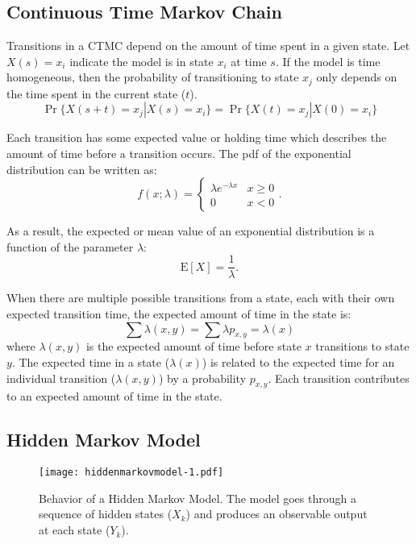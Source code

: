 \subsection{Continuous Time Markov Chain}

Transitions in a \ac{CTMC} depend on the amount of time spent in a given state.
Let $X(s) = x_i$ indicate the model is in state $x_i$ at time $s$.
If the model is time homogeneous, then the probability of transitioning to state $x_j$ only depends on the time spent in the current state ($t$).
\begin{equation}
    \Pr\{ X(s+t)=x_j | X(s) = x_i \} = \Pr\{ X(t)=x_j | X(0) = x_i \}
\end{equation}

Each transition has some expected value or holding time which describes the amount of time before a transition occurs.
The \ac{pdf} of the exponential distribution can be written as: \cite{MARKOV1}
\begin{equation}
f(x;\lambda) = \begin{cases}
\lambda e^{-\lambda x} & x \ge 0 \\
0 & x < 0
\end{cases}.
\end{equation}

As a result, the expected or mean value of an exponential distribution is a function of the parameter $\lambda$: \cite{MARKOV1}
\begin{equation}
\mathrm{E}[X] = \frac{1}{\lambda}. \!
\end{equation}

When there are multiple possible transitions from a state, each with their own expected transition time, the expected amount of time in the state is: \cite{MARKOV2}
\begin{equation}
\sum \lambda(x,y) = \sum \lambda p_{x,y} = \lambda(x)
\end{equation}
where $\lambda(x,y)$ is the expected amount of time before state $x$ transitions to state $y$.
The expected time in a state ($\lambda(x)$) is related to the expected time for an individual transition ($\lambda(x,y)$) by a probability $p_{x,y}$.
Each transition contributes to an expected amount of time in the state.

\subsection{Hidden Markov Model}

\begin{figure}
	\centering
	\texttt{[image: hiddenmarkovmodel-1.pdf]}
	\caption[Behavior of a hidden Markov model.]{Behavior of a Hidden Markov Model. The model goes through a sequence of hidden states ($X_k$) and produces an observable output at each state ($Y_k$).}
	\label{fig:hmm-1}
\end{figure}

